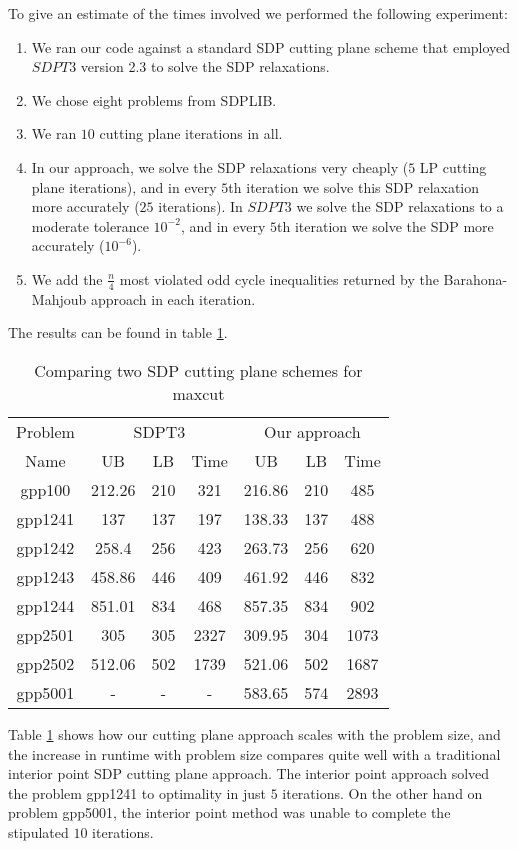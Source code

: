 \documentclass[12pt]{article}
\begin{document}
To give an estimate of the times involved we performed the following experiment:
\begin{enumerate}
\item We ran our code against a standard SDP cutting plane scheme
that employed $SDPT3$ \cite{toh1} version 2.3 to solve the SDP
relaxations. \item We chose eight problems from SDPLIB. \item We
ran $10$ cutting plane iterations in all. \item In our approach,
we solve the SDP relaxations very cheaply ($5$ LP cutting plane
iterations), and in every $5$th iteration we solve this SDP
relaxation more accurately ($25$ iterations). In $SDPT3$ we solve
the SDP relaxations to a moderate tolerance $10^{-2}$, and in every
$5$th iteration we solve the SDP more accurately ($10^{-6}$). \item
We add the $\frac{n}{4}$ most violated odd cycle inequalities
returned by the Barahona-Mahjoub approach in each iteration.
\end{enumerate}
The results can be found in table \ref{maxcut_comparison}.
\begin{table}[htbp]
\begin{center}
\begin{tabular}{|c|c|c|c|c|c|c|} \hline
Problem & \multicolumn{3}{|c|}{SDPT3} & \multicolumn{3}{|c|}{Our approach} \\
Name & UB & LB & Time & UB & LB & Time \\ \hline \hline
gpp100 & 212.26 & 210 & 321 & 216.86 & 210 & 485 \\ \hline
gpp1241 & 137 & 137 & 197 %
 & 138.33 & 137 & 488 \\ \hline
gpp1242 & 258.4 & 256 & 423 & 263.73 & 256 & 620 \\ \hline
gpp1243 & 458.86 & 446 & 409 & 461.92 & 446 & 832 \\ \hline
gpp1244 & 851.01 & 834 & 468 & 857.35 & 834 & 902 \\ \hline
gpp2501 & 305 & 305 & 2327 & 309.95 & 304 & 1073 \\ \hline
gpp2502 & 512.06 & 502 & 1739 & 521.06 & 502 & 1687 \\ \hline
gpp5001 & - & - & - & 583.65 & 574 & 2893 \\ \hline
\end{tabular}
\caption{\label{maxcut_comparison} Comparing two SDP cutting plane schemes for maxcut}
\end{center}
\end{table}
Table
\ref{maxcut_comparison} shows how our cutting plane approach
scales with the problem size, and the increase in runtime with
problem size compares quite well with a traditional interior point
SDP cutting plane approach. The interior point approach solved the
problem gpp1241 to optimality in just $5$ iterations. On the other
hand on problem gpp5001, the interior point method was unable to
complete the stipulated $10$ iterations.
\end{document}
